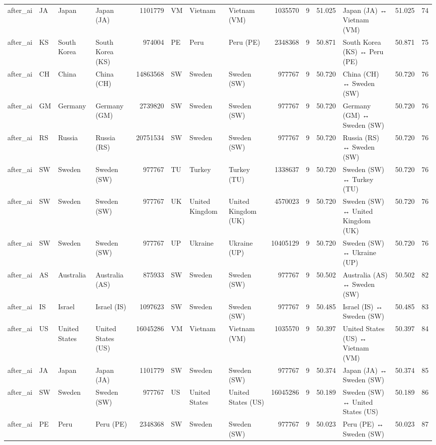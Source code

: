 \begin{tabular}{llllrlllrrrlrr}
after\_ai & JA & Japan & Japan (JA) & 1101779 & VM & Vietnam & Vietnam (VM) & 1035570 & 9 & 51.025 & Japan (JA) ↔ Vietnam (VM) & 51.025 & 74 \\
after\_ai & KS & South Korea & South Korea (KS) & 974004 & PE & Peru & Peru (PE) & 2348368 & 9 & 50.871 & South Korea (KS) ↔ Peru (PE) & 50.871 & 75 \\
after\_ai & CH & China & China (CH) & 14863568 & SW & Sweden & Sweden (SW) & 977767 & 9 & 50.720 & China (CH) ↔ Sweden (SW) & 50.720 & 76 \\
after\_ai & GM & Germany & Germany (GM) & 2739820 & SW & Sweden & Sweden (SW) & 977767 & 9 & 50.720 & Germany (GM) ↔ Sweden (SW) & 50.720 & 76 \\
after\_ai & RS & Russia & Russia (RS) & 20751534 & SW & Sweden & Sweden (SW) & 977767 & 9 & 50.720 & Russia (RS) ↔ Sweden (SW) & 50.720 & 76 \\
after\_ai & SW & Sweden & Sweden (SW) & 977767 & TU & Turkey & Turkey (TU) & 1338637 & 9 & 50.720 & Sweden (SW) ↔ Turkey (TU) & 50.720 & 76 \\
after\_ai & SW & Sweden & Sweden (SW) & 977767 & UK & United Kingdom & United Kingdom (UK) & 4570023 & 9 & 50.720 & Sweden (SW) ↔ United Kingdom (UK) & 50.720 & 76 \\
after\_ai & SW & Sweden & Sweden (SW) & 977767 & UP & Ukraine & Ukraine (UP) & 10405129 & 9 & 50.720 & Sweden (SW) ↔ Ukraine (UP) & 50.720 & 76 \\
after\_ai & AS & Australia & Australia (AS) & 875933 & SW & Sweden & Sweden (SW) & 977767 & 9 & 50.502 & Australia (AS) ↔ Sweden (SW) & 50.502 & 82 \\
after\_ai & IS & Israel & Israel (IS) & 1097623 & SW & Sweden & Sweden (SW) & 977767 & 9 & 50.485 & Israel (IS) ↔ Sweden (SW) & 50.485 & 83 \\
after\_ai & US & United States & United States (US) & 16045286 & VM & Vietnam & Vietnam (VM) & 1035570 & 9 & 50.397 & United States (US) ↔ Vietnam (VM) & 50.397 & 84 \\
after\_ai & JA & Japan & Japan (JA) & 1101779 & SW & Sweden & Sweden (SW) & 977767 & 9 & 50.374 & Japan (JA) ↔ Sweden (SW) & 50.374 & 85 \\
after\_ai & SW & Sweden & Sweden (SW) & 977767 & US & United States & United States (US) & 16045286 & 9 & 50.189 & Sweden (SW) ↔ United States (US) & 50.189 & 86 \\
after\_ai & PE & Peru & Peru (PE) & 2348368 & SW & Sweden & Sweden (SW) & 977767 & 9 & 50.023 & Peru (PE) ↔ Sweden (SW) & 50.023 & 87 \\

\end{tabular}
